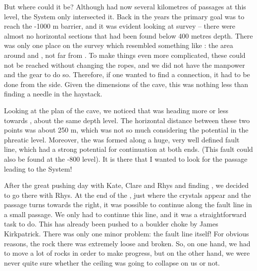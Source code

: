 But where could it be? Although  had now several
kilometres of passages at this level, the System only intersected it.
Back in the years the primary goal was to reach the -1000 m barrier, and
it was evident looking at survey -- there were almost no horizontal
sections that had been found below 400 metres depth. There was only one
place on the survey which resembled something like : the area around  and , not far
from . To make things even more complicated, these
could not be reached without changing the ropes, and we did not have the
manpower and the gear to do so. Therefore, if one wanted to find a
connection, it had to be done from the  side. Given the
dimensions of the cave, this was nothing less than finding a needle in
the haystack.

Looking at the plan of the cave, we noticed that 
was heading more or less towards , about the same depth
level. The horizontal distance between these two points was about 250 m,
which was not so much considering the potential in the phreatic level.
Moreover, the  was formed along a huge, very well
defined fault line, which had a strong potential for continuation at
both ends. (This fault could also be found at the -800 level). It is
there that I wanted to look for the passage leading to the System!

After the great pushing day with Kate, Clare and Rhys and finding
, we decided to go there with Rhys. At the end of the
, just where the crystals appear and the passage
turns towards the right, it was possible to continue along the fault
line in a small passage. We only had to continue this line, and it was a
straightforward task to do. This has already been pushed to a boulder
choke by James Kirkpatrick. There was only one minor problem: the fault
line itself! For obvious reasons, the rock there was extremely loose and
broken. So, on one hand, we had to move a lot of rocks in order to make
progress, but on the other hand, we were never quite sure whether the
ceiling was going to collapse on us or not.


